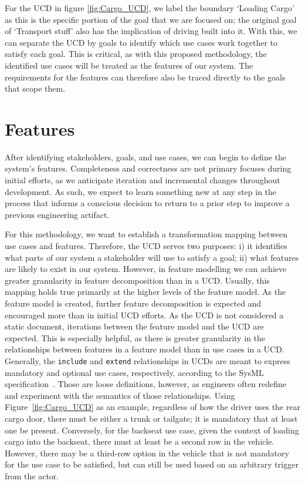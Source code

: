 For the \gls{UCD} in figure \ref{fig:Cargo_UCD}, we label the boundary `Loading Cargo' as this is the specific portion of the goal that we are focused on; the original goal of `Transport stuff' also has the implication of driving built into it. With this, we can separate the \gls{UCD} by goals to identify which use cases work together to satisfy each goal. This is critical, as with this proposed methodology, the identified use cases will be treated as the features of our system. The requirements for the features can therefore also be traced directly to the goals that scope them. 

\section{Features}
\label{sec:features}

After identifying stakeholders, goals, and use cases, we can begin to define the system's features. Completeness and correctness are not primary focuses during initial efforts, as we anticipate iteration and incremental changes throughout development. As such, we expect to learn something new at any step in the process that informs a conscious decision to return to a prior step to improve a previous engineering artifact. 

For this methodology, we want to establish a transformation mapping between use cases and features. Therefore, the \gls{UCD} serves two purposes: i) it identifies what parts of our system a stakeholder will use to satisfy a goal; ii) what features are likely to exist in our system. However, in feature modelling we can achieve greater granularity in feature decomposition than in a \gls{UCD}. Usually, this mapping holds true primarily at the higher levels of the feature model. As the feature model is created, further feature decomposition is expected and encouraged more than in initial \gls{UCD} efforts. As the \gls{UCD} is not considered a static document, iterations between the feature model and the \gls{UCD} are expected. This is especially helpful, as there is greater granularity in the relationships between features in a feature model than in use cases in a \gls{UCD}. Generally, the \texttt{include} and \texttt{extend} relationships in \gls{UCD}s are meant to express mandatory and optional use cases, respectively, according to the SysML specification~\cite{sysml2019omg}. Those are loose definitions, however, as engineers often redefine and experiment with the semantics of those relationships. Using Figure~\ref {fig:Cargo_UCD} as an example, regardless of how the driver uses the rear cargo door, there must be either a trunk or tailgate; it is mandatory that at least one be present. Conversely, for the backseat use case, given the context of loading cargo into the backseat, there must at least be a second row in the vehicle. However, there may be a third-row option in the vehicle that is not mandatory for the use case to be satisfied, but can still be used based on an arbitrary trigger from the actor.


